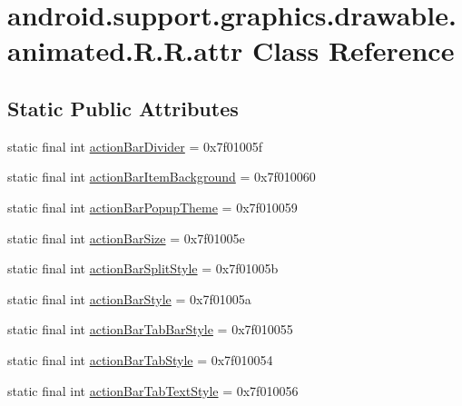 \hypertarget{classandroid_1_1support_1_1graphics_1_1drawable_1_1animated_1_1_r_1_1attr}{
\section{android.support.graphics.drawable.animated.R.R.attr Class Reference}
\label{classandroid_1_1support_1_1graphics_1_1drawable_1_1animated_1_1_r_1_1attr}
}
\subsection*{Static Public Attributes}
\begin{CompactItemize}
\item 
static final int \hyperlink{classandroid_1_1support_1_1graphics_1_1drawable_1_1animated_1_1_r_1_1attr_a155d0d3c41de7e3a6f0e0e79d5d5b24}{actionBarDivider} = 0x7f01005f
\item 
static final int \hyperlink{classandroid_1_1support_1_1graphics_1_1drawable_1_1animated_1_1_r_1_1attr_e58f29e7f7325f549b089fb375b9998d}{actionBarItemBackground} = 0x7f010060
\item 
static final int \hyperlink{classandroid_1_1support_1_1graphics_1_1drawable_1_1animated_1_1_r_1_1attr_8b0a60735b485157af40117b4a048ea7}{actionBarPopupTheme} = 0x7f010059
\item 
static final int \hyperlink{classandroid_1_1support_1_1graphics_1_1drawable_1_1animated_1_1_r_1_1attr_dfa97a2f94343e7b092349f424f283bc}{actionBarSize} = 0x7f01005e
\item 
static final int \hyperlink{classandroid_1_1support_1_1graphics_1_1drawable_1_1animated_1_1_r_1_1attr_ad2b356e5efe4cf219c5d101ee5886fe}{actionBarSplitStyle} = 0x7f01005b
\item 
static final int \hyperlink{classandroid_1_1support_1_1graphics_1_1drawable_1_1animated_1_1_r_1_1attr_a294a62372ae26cb6437013f2f5182d3}{actionBarStyle} = 0x7f01005a
\item 
static final int \hyperlink{classandroid_1_1support_1_1graphics_1_1drawable_1_1animated_1_1_r_1_1attr_9cb8ca69de0209d8c289db766f936d77}{actionBarTabBarStyle} = 0x7f010055
\item 
static final int \hyperlink{classandroid_1_1support_1_1graphics_1_1drawable_1_1animated_1_1_r_1_1attr_a7d6c7306ca0951c4e0f9bad250b04d8}{actionBarTabStyle} = 0x7f010054
\item 
static final int \hyperlink{classandroid_1_1support_1_1graphics_1_1drawable_1_1animated_1_1_r_1_1attr_24f4b433ff51aa72a4b6deec7fee9b42}{actionBarTabTextStyle} = 0x7f010056

\end{CompactItemize}
